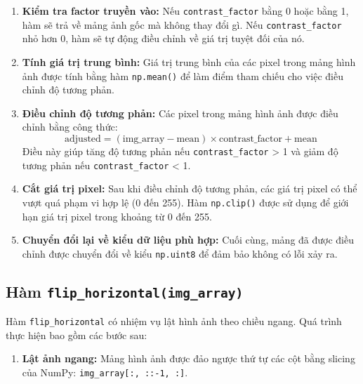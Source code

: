 \begin{enumerate}

	\item \textbf{Kiểm tra factor truyền vào:}
	      Nếu \texttt{contrast\_factor} bằng 0 hoặc bằng 1, hàm sẽ trả về mảng ảnh gốc mà không thay đổi gì.
	      Nếu \texttt{contrast\_factor} nhỏ hơn 0, hàm sẽ tự động điều chỉnh về giá trị tuyệt đối của nó.

	\item \textbf{Tính giá trị trung bình:}
	      Giá trị trung bình của các pixel trong mảng hình ảnh được tính bằng hàm \texttt{np.mean()} để làm điểm tham chiếu cho việc điều chỉnh độ tương phản.

	\item \textbf{Điều chỉnh độ tương phản:}
	      Các pixel trong mảng hình ảnh được điều chỉnh bằng công thức:
	      \[
		      \text{adjusted} = (\text{img\_array} - \text{mean}) \times \text{contrast\_factor} + \text{mean}
	      \]
	      Điều này giúp tăng độ tương phản nếu \texttt{contrast\_factor} > 1 và giảm độ tương phản nếu \texttt{contrast\_factor} < 1.

	\item \textbf{Cắt giá trị pixel:}
	      Sau khi điều chỉnh độ tương phản, các giá trị pixel có thể vượt quá phạm vi hợp lệ (0 đến 255). Hàm \texttt{np.clip()} được sử dụng để giới hạn giá trị pixel trong khoảng từ 0 đến 255.

	\item \textbf{Chuyển đổi lại về kiểu dữ liệu phù hợp:}
	      Cuối cùng, mảng đã được điều chỉnh được chuyển đổi về kiểu \texttt{np.uint8} để đảm bảo không có lỗi xảy ra.

\end{enumerate}



\subsection{Hàm \texttt{flip\_horizontal(img\_array)}}
Hàm \texttt{flip\_horizontal} có nhiệm vụ lật hình ảnh theo chiều ngang. Quá trình thực hiện bao gồm các bước sau:

\begin{enumerate}

	\item \textbf{Lật ảnh ngang:}
	      Mảng hình ảnh được đảo ngược thứ tự các cột bằng slicing của NumPy: \texttt{img\_array[:, ::-1, :]}.

\end{enumerate}

